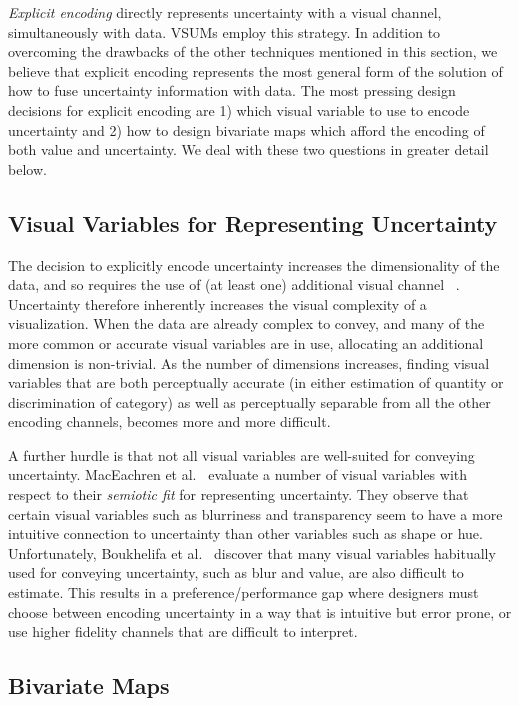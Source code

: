 \documentclass{vgtc}                          %
\begin{document}
\emph{Explicit encoding} directly represents uncertainty with a visual channel, simultaneously with data. VSUMs employ this strategy. In addition to overcoming the drawbacks of the other techniques mentioned in this section, we believe that explicit encoding represents the most general form of the solution of how to fuse uncertainty information with data. The most pressing design decisions for explicit encoding are 1) which visual variable to use to encode uncertainty and 2) how to design bivariate maps which afford the encoding of both value and uncertainty. We deal with these two questions in greater detail below.

\subsection{Visual Variables for Representing Uncertainty}

The decision to explicitly encode uncertainty increases the dimensionality of the data, and so requires the use of (at least one) additional visual channel ~\cite{brodlie2012review}. Uncertainty therefore inherently increases the visual complexity of a visualization. When the data are already complex to convey, and many of the more common or accurate visual variables are in use, allocating an additional dimension is non-trivial. As the number of dimensions increases, finding visual variables that are both perceptually accurate (in either estimation of quantity or discrimination of category) as well as perceptually separable from all the other encoding channels, becomes more and more difficult.

A further hurdle is that not all visual variables are well-suited for conveying uncertainty. MacEachren et al.~\cite{maceachren2012visual} evaluate a number of visual variables with respect to their \emph{semiotic fit} for representing uncertainty. They observe that certain visual variables such as blurriness and transparency seem to have a more intuitive connection to uncertainty than other variables such as shape or hue. Unfortunately, Boukhelifa et al.~\cite{boukhelifa2012evaluating} discover that many visual variables habitually used for conveying uncertainty, such as blur and value, are also difficult to estimate. This results in a preference/performance gap where designers must choose between encoding uncertainty in a way that is intuitive but error prone, or use higher fidelity channels that are difficult to interpret. 
 
\subsection{Bivariate Maps}
\end{document}

